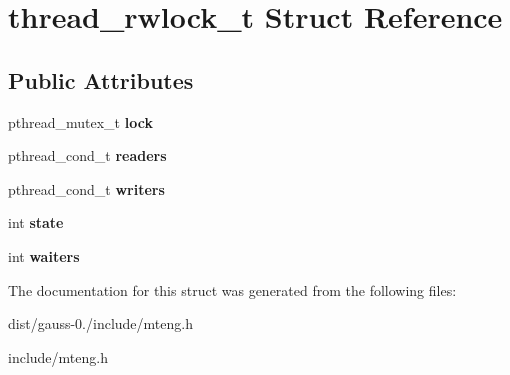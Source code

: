 \hypertarget{structthread__rwlock__t}{\section{thread\-\_\-rwlock\-\_\-t Struct Reference}
\label{structthread__rwlock__t}
}
\subsection*{Public Attributes}
\begin{DoxyCompactItemize}
\item 
\hypertarget{structthread__rwlock__t_a477a97302efb03088131f2b88431911a}{pthread\-\_\-mutex\-\_\-t {\bfseries lock}}\label{structthread__rwlock__t_a477a97302efb03088131f2b88431911a}

\item 
\hypertarget{structthread__rwlock__t_ac712f6142a8e68cbfc63cd6ed32f8532}{pthread\-\_\-cond\-\_\-t {\bfseries readers}}\label{structthread__rwlock__t_ac712f6142a8e68cbfc63cd6ed32f8532}

\item 
\hypertarget{structthread__rwlock__t_ad7e274a973ab673f0af7d4c6154800cc}{pthread\-\_\-cond\-\_\-t {\bfseries writers}}\label{structthread__rwlock__t_ad7e274a973ab673f0af7d4c6154800cc}

\item 
\hypertarget{structthread__rwlock__t_aac34f125a85748f69d0b61b3b4fdbd5c}{int {\bfseries state}}\label{structthread__rwlock__t_aac34f125a85748f69d0b61b3b4fdbd5c}

\item 
\hypertarget{structthread__rwlock__t_aa1b8248c9280f5c6e5609c1b326a5d15}{int {\bfseries waiters}}\label{structthread__rwlock__t_aa1b8248c9280f5c6e5609c1b326a5d15}

\end{DoxyCompactItemize}


The documentation for this struct was generated from the following files\-:\begin{DoxyCompactItemize}
\item 
dist/gauss-\/0./include/mteng.\-h\item 
include/mteng.\-h\end{DoxyCompactItemize}

